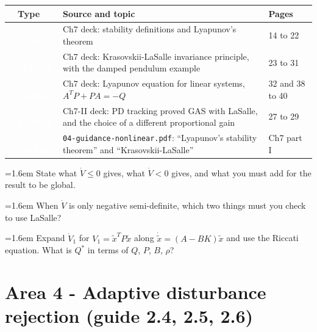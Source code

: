 \documentclass[10pt,a4paper]{article}
\newcommand{\cb}{\raisebox{-0.35ex}{\Large$\square$}}
\newcommand{\srctag}[2]{\colorbox{#1}{\textcolor{white}{\textbf{\scriptsize\,#2\,}}}}
\newcommand{\SLIDES}{\srctag{slides}{SLIDES}}
\newcommand{\NOTES}{\srctag{notes}{NOTES}}
\newcommand{\chk}[1]{\par\noindent\hangindent=1.6em\hangafter=1 \cb\hspace{0.6em}#1}
\begin{document}
\begin{tabularx}{\textwidth}{@{}C T X l@{}}
\toprule
\cb & Type & Source and topic & Pages\\
\midrule
\cb & \SLIDES & Ch7 deck: stability definitions and Lyapunov's theorem & 14 to 22\\
\cb & \SLIDES & Ch7 deck: Krasovskii-LaSalle invariance principle, with the damped pendulum example & 23 to 31\\
\cb & \SLIDES & Ch7 deck: Lyapunov equation for linear systems, $A^TP+PA=-Q$ & 32 and 38 to 40\\
\cb & \SLIDES & Ch7-II deck: PD tracking proved GAS with LaSalle, and the choice of a different proportional gain & 27 to 29\\
\cb & \NOTES & \texttt{04-guidance-nonlinear.pdf}: ``Lyapunov's stability theorem'' and ``Krasovskii-LaSalle'' & Ch7 part I\\
\bottomrule
\end{tabularx}
\begin{selfcheck}
\chk{State what $\dot V\le 0$ gives, what $\dot V<0$ gives, and what you must add for the result to be global.}
\chk{When $\dot V$ is only negative semi-definite, which two things must you check to use LaSalle?}
\chk{Expand $\dot V_1$ for $V_1=\tilde x^TP\tilde x$ along $\dot{\tilde x}=(A-BK)\tilde x$ and use the Riccati equation. What is $Q^*$ in terms of $Q$, $P$, $B$, $\rho$?}
\end{selfcheck}

\section*{Area 4 - Adaptive disturbance rejection \hfill\normalfont\small (guide 2.4, 2.5, 2.6)}
\end{document}

